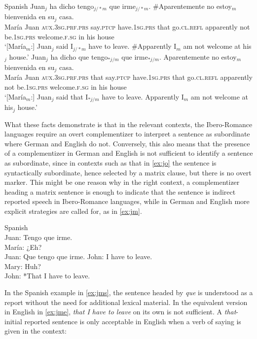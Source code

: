 \ea Spanish
	\ea\label{ex:joc}	
	\gll  [María$_m$:] Juan$_j$ ha dicho tengo$_{j/*m}$ que irme$_{j/*m}$. \#Aparentemente no estoy$_m$ bienvenida en su$_j$ casa. \\
	María Juan \textsc{aux.3sg.prf.prs} say.\textsc{ptcp} have.\textsc{1sg.prs} that go.\textsc{cl.refl} apparently not be.\textsc{1sg.prs} welcome.\textsc{f.sg} in his house\\
		\glt `[María$_m$:] Juan$_j$ said I$_{j/*m}$ have to leave. \#Apparently I$_m$ am not welcome at his$_j$ house.'
	\ex\label{ex:jod}
	\gll [María$_m$:] Juan$_j$ ha dicho que tengo$_{*j/m}$ que irme$_{*j/m}$. Aparentemente no estoy$_m$ bienvenida en su$_j$ casa. \\
		María Juan \textsc{aux.3sg.prf.prs} that say.\textsc{ptcp} have.\textsc{1sg.prs} that go.\textsc{cl.refl} apparently not be.\textsc{1sg.prs} welcome.\textsc{f.sg} in his house\\
		\glt `[María$_m$:] Juan$_j$ said that I$_{*j/m}$ have to leave. Apparently I$_m$ am not welcome at his$_j$ house.'	
\z	
\z\largerpage


What these facts demonstrate is that in the relevant contexts, the Ibero-Ro\-mance languages require an overt complementizer to interpret a sentence as subordinate where German and English do not. Conversely, this also means that the presence of a complementizer in German and English is not sufficient to identify a sentence as subordinate, since in contexts such as that in \eqref{ex:jo} the sentence is syntactically subordinate, hence selected by a matrix clause, but there is no overt marker. This might be one  reason why in the right context, a complementizer heading a matrix sentence is enough to indicate that the sentence is  indirect reported speech in Ibero-Romance languages, while in German and English more explicit strategies are called for, as in \eqref{ex:jm}.

\ea\label{ex:jm}
\ea
\label{ex:jms}
Spanish\\ Juan: Tengo que irme. \\
 María: ¿Eh?\\
 Juan: Que tengo que irme. 
\ex\label{ex:jme} John: I have to leave.\\
Mary: Huh?\\
John: *That I have to leave.
\z
\z

In the Spanish example in \eqref{ex:jms}, the sentence headed by \emph{que} is understood as a report without the need for additional lexical material. In the equivalent version in English in \eqref{ex:jme}, \emph{that I have to leave} on its own is not sufficient.  A \emph{that}-initial reported sentence is only acceptable  in English when a verb of saying is given in the context: 

